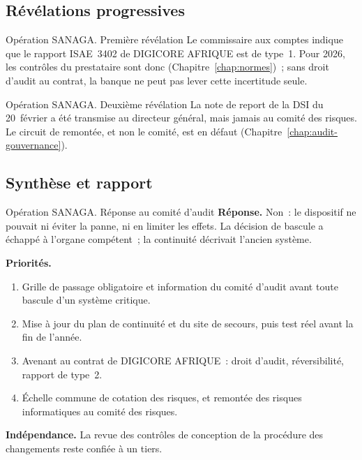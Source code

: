 \subsection{Révélations progressives}

\begin{boxscenario}{Opération SANAGA. Première révélation}
Le commissaire aux comptes indique que le rapport ISAE~3402 de DIGICORE
AFRIQUE est de type~1. Pour 2026, les contrôles du prestataire sont donc
\NEK{} (Chapitre~\ref{chap:normes})~; sans droit d'audit au contrat, la
banque ne peut pas lever cette incertitude seule.
\end{boxscenario}

\begin{boxscenario}{Opération SANAGA. Deuxième révélation}
La note de report de la DSI du 20~février a été transmise au directeur
général, mais jamais au comité des risques. Le circuit de remontée, et
non le comité, est en défaut (Chapitre~\ref{chap:audit-gouvernance}).
\end{boxscenario}

\subsection{Synthèse et rapport}

\begin{boxscenario}{Opération SANAGA. Réponse au comité d'audit}
\textbf{Réponse.} Non~: le dispositif ne pouvait ni éviter la panne, ni en
limiter les effets. La décision de bascule a échappé à l'organe
compétent~; la continuité décrivait l'ancien système.

\medskip
\textbf{Priorités.}
\begin{enumerate}
    \item Grille de passage obligatoire et information du comité d'audit
          avant toute bascule d'un système critique.
    \item Mise à jour du plan de continuité et du site de secours,
          puis test réel avant la fin de l'année.
    \item Avenant au contrat de DIGICORE AFRIQUE~: droit d'audit,
          réversibilité, rapport de type~2.
    \item Échelle commune de cotation des risques, et remontée des risques
          informatiques au comité des risques.
\end{enumerate}
\textbf{Indépendance.} La revue des contrôles de conception de la
procédure des changements reste confiée à un tiers.
\end{boxscenario}

